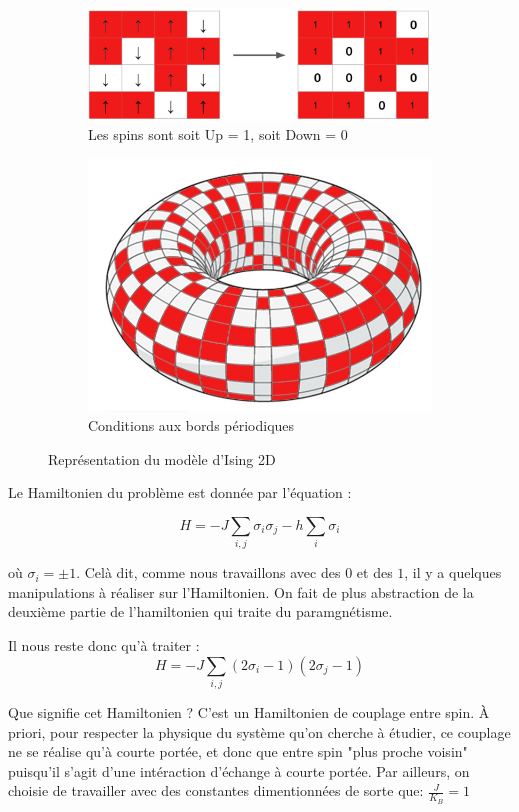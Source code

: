 \documentclass[11pt, parskip=half]{scrartcl} %
\begin{document}
\begin{figure}[h]
	\begin{subfigure}{0.5\textwidth}
		\centering
		\includegraphics[width=0.95\linewidth]{./figures/torus_left.jpg}
		\caption{Les spins sont soit Up = 1, soit Down = 0}
	\end{subfigure}
	\begin{subfigure}{0.5\textwidth}
		\centering
		\includegraphics[width=0.5\linewidth]{./figures/torus_right.jpg}
		\caption{Conditions aux bords périodiques}
	\end{subfigure}
	\caption{Représentation du modèle d'Ising 2D}
	\label{fig:ising2D}
\end{figure}


Le Hamiltonien du problème est donnée par l'équation :

\begin{equation*}
    H = -J  \displaystyle \sum_{i,j}\sigma_{i}\sigma_{j} - h\displaystyle \sum_{i} \sigma_{i}
\end{equation*}

où $\sigma_{i} = \pm 1$. Celà dit, comme nous travaillons avec des $0$ et des $1$, il y a quelques manipulations à réaliser sur l'Hamiltonien. On fait de plus abstraction de la deuxième partie de l'hamiltonien qui traite du paramgnétisme.

Il nous reste donc qu'à traiter : 
\begin{equation*}
    H = -J  \displaystyle \sum_{i,j}(2\sigma_{i}-1)(2\sigma_{j}-1)
\end{equation*}

Que signifie cet Hamiltonien ? C'est un Hamiltonien de couplage entre spin. À priori, pour respecter la physique du système qu'on cherche à étudier, ce couplage ne se réalise qu'à courte portée, et donc que entre spin "plus proche voisin" puisqu'il s'agit d'une intéraction d'échange à courte portée. Par ailleurs, on choisie de travailler avec des constantes dimentionnées de sorte que: $\frac{J}{K_B}=1$
\end{document}

